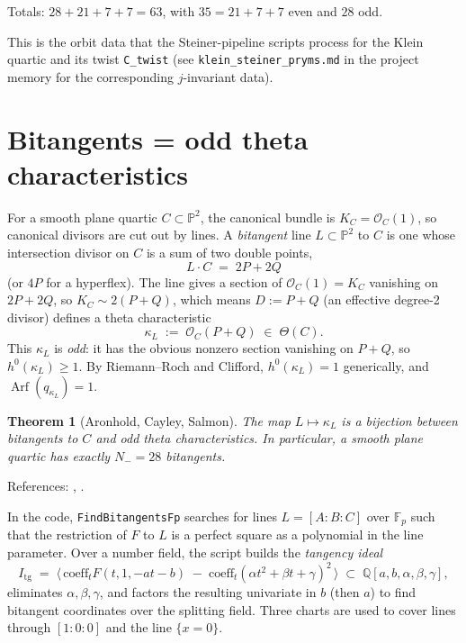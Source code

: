 \documentclass[11pt]{amsart}
\theoremstyle{plain}
\newtheorem{theorem}{Theorem}[section]
\theoremstyle{definition}
\theoremstyle{remark}
\newcommand{\Arf}{\operatorname{Arf}}
\newcommand{\Pp}{\mathbb P}
\newcommand{\F}{\mathbb F}
\newcommand{\Q}{\mathbb Q}
\newcommand{\Oo}{\mathcal O}
\begin{document}
Totals: $28 + 21 + 7 + 7 = 63$, with $35 = 21 + 7 + 7$ even and $28$ odd. \checkmark

This is the orbit data that the Steiner-pipeline scripts process for the
Klein quartic and its twist \texttt{C\_twist} (see
\texttt{klein\_steiner\_pryms.md} in the project memory for the corresponding
$j$-invariant data).

\section{Bitangents = odd theta characteristics}
\label{sec:bitangents}

For a smooth plane quartic $C \subset \Pp^2$, the canonical bundle is
$K_C = \Oo_C(1)$, so canonical divisors are cut out by lines. A
\emph{bitangent} line $L \subset \Pp^2$ to $C$ is one whose intersection
divisor on $C$ is a sum of two double points,
\[
  L \cdot C \;=\; 2P + 2Q
\]
(or $4P$ for a hyperflex). The line gives a section of $\Oo_C(1) = K_C$
vanishing on $2P + 2Q$, so $K_C \sim 2(P + Q)$, which means $D := P + Q$ (an
effective degree-2 divisor) defines a theta characteristic
\[
  \kappa_L \;:=\; \Oo_C(P + Q) \;\in\; \Theta(C).
\]
This $\kappa_L$ is \emph{odd}: it has the obvious nonzero section vanishing
on $P + Q$, so $h^0(\kappa_L) \ge 1$. By Riemann--Roch and Clifford,
$h^0(\kappa_L) = 1$ generically, and $\Arf(q_{\kappa_L}) = 1$.

\begin{theorem}[Aronhold, Cayley, Salmon]
The map $L \mapsto \kappa_L$ is a bijection between bitangents to $C$ and
odd theta characteristics. In particular, a smooth plane quartic has exactly
$N_- = 28$ bitangents.
\end{theorem}

References: \cite[\S 216]{Salmon1879}, \cite[\S 6.1]{Dolgachev2012}.

In the code, \texttt{FindBitangentsFp} searches for lines $L = [A:B:C]$ over
$\F_p$ such that the restriction of $F$ to $L$ is a perfect square as a
polynomial in the line parameter. Over a number field, the script builds
the \emph{tangency ideal}
\[
  I_{\mathrm{tg}} \;=\; \bigl\langle\,
  \mathrm{coeff}_t F(t,1,-at-b) \;-\; \mathrm{coeff}_t (\alpha t^2 + \beta t + \gamma)^2
  \,\bigr\rangle \;\subset\; \Q[a,b,\alpha,\beta,\gamma],
\]
eliminates $\alpha,\beta,\gamma$, and factors the resulting univariate in
$b$ (then $a$) to find bitangent coordinates over the splitting field. Three
charts are used to cover lines through $[1\!:\!0\!:\!0]$ and the line
$\{x = 0\}$.
\end{document}
